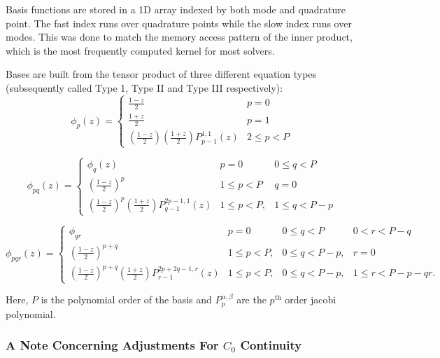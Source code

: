 Basis functions are stored in a 1D array indexed by both mode and quadrature point. The fast index runs over quadrature points while the slow index runs over modes. This was done to match the memory access pattern of the inner product, which is the most frequently computed kernel for most solvers.

Bases are built from the tensor product of three different equation types (subsequently called Type 1, Type II and Type III respectively):
\begin{equation}
    \phi_{p}(z) =
    \begin{cases}
        \frac{1 - z}{2} & p = 0 \\
        \frac{1 + z}{2} & p = 1 \\
        \left(\frac{1-z}{2}\right)\left(\frac{1+z}{2}\right) P_{p-1}^{1,1}(z) & 2 \leq p < P
    \end{cases}
\end{equation}

\[
    \phi_{pq}(z) = \left\{
    \begin{array}{lll}
        \phi_{q}(z) & p = 0 & 0 \leq q < P \\
        \left(\frac{1 - z}{2}\right)^p & 1 \leq p < P & q = 0 \\
        \left(\frac{1-z}{2}\right)^p \left(\frac{1+z}{2}\right) P_{q-1}^{2p-1,1}(z) & 1 \leq p < P, & 1 \leq q < P - p
    \end{array}\right.
\]

\[
    \phi_{pqr}(z) = \left\{
    \begin{array}{llll}
        \phi_{qr} & p = 0 & 0 \leq q < P & 0 < r < P - q \\
        \left(\frac{1-z}{2}\right)^{p+q} & 1 \leq p < P, & 0 \leq q < P - p, & r = 0 \\
        \left(\frac{1 - z}{2}\right)^{p + q} \left(\frac{1+z}{2}\right) P_{r-1}^{2p + 2q - 1, r}(z) & 1 \leq p < P, & 0 \leq q < P - p, & 1 \leq r < P - p - qr.
    \end{array}\right.
\]

Here, $P$ is the polynomial order of the basis and $P^{\alpha,\beta}_{p}$ are the $p^{\text{th}}$ order jacobi polynomial.

\subsubsection{A Note Concerning Adjustments For $C_0$ Continuity}


